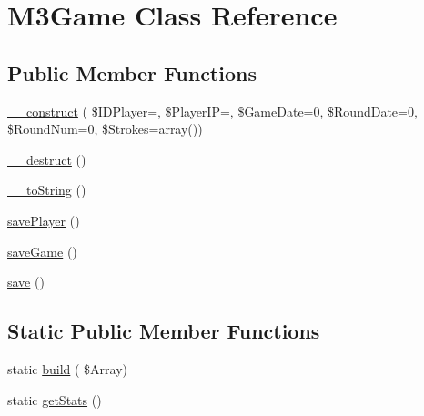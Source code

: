 \hypertarget{class_m3_game}{}\section{M3\+Game Class Reference}
\label{class_m3_game}
\subsection*{Public Member Functions}
\begin{DoxyCompactItemize}
\item 
\hyperlink{class_m3_game_a0a95aa60413fd78db8b25f2ff6b0e885}{\+\_\+\+\_\+construct} ( \$I\+D\+Player=\textquotesingle{}\textquotesingle{}, \$Player\+IP=\textquotesingle{}\textquotesingle{}, \$Game\+Date=0, \$Round\+Date=0, \$Round\+Num=0, \$Strokes=array())
\item 
\hyperlink{class_m3_game_a40cac41918003792e3387919fa6259ad}{\+\_\+\+\_\+destruct} ()
\item 
\hyperlink{class_m3_game_a2c801e9cf5f799663c8713551e9e3eca}{\+\_\+\+\_\+to\+String} ()
\item 
\hyperlink{class_m3_game_ad8d64fa5c87bbf87f0cdd9930363eae8}{save\+Player} ()
\item 
\hyperlink{class_m3_game_a1f48931de438241e2b54b40895fafd95}{save\+Game} ()
\item 
\hyperlink{class_m3_game_a5743cdeed815caf98e1cc1df18d1e646}{save} ()
\end{DoxyCompactItemize}
\subsection*{Static Public Member Functions}
\begin{DoxyCompactItemize}
\item 
static \hyperlink{class_m3_game_a14b38fdf7f73b3947f039fd8e6fc2cce}{build} ( \$Array)
\item 
static \hyperlink{class_m3_game_aaf1ddd0b90e0344509b0725546875f90}{get\+Stats} ()
\end{DoxyCompactItemize}
